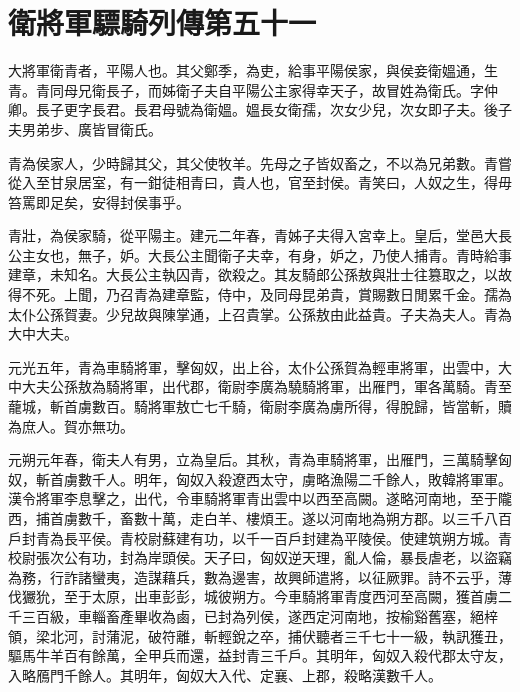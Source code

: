 \chapter{衛將軍驃騎列傳第五十一}

大將軍衛青者，平陽人也。其父鄭季，為吏，給事平陽侯家，與侯妾衛媼通，生青。青同母兄衛長子，而姊衛子夫自平陽公主家得幸天子，故冒姓為衛氏。字仲卿。長子更字長君。長君母號為衛媼。媼長女衛孺，次女少兒，次女即子夫。後子夫男弟步、廣皆冒衛氏。

青為侯家人，少時歸其父，其父使牧羊。先母之子皆奴畜之，不以為兄弟數。青嘗從入至甘泉居室，有一鉗徒相青曰，貴人也，官至封侯。青笑曰，人奴之生，得毋笞罵即足矣，安得封侯事乎。

青壯，為侯家騎，從平陽主。建元二年春，青姊子夫得入宮幸上。皇后，堂邑大長公主女也，無子，妒。大長公主聞衛子夫幸，有身，妒之，乃使人捕青。青時給事建章，未知名。大長公主執囚青，欲殺之。其友騎郎公孫敖與壯士往篡取之，以故得不死。上聞，乃召青為建章監，侍中，及同母昆弟貴，賞賜數日閒累千金。孺為太仆公孫賀妻。少兒故與陳掌通，上召貴掌。公孫敖由此益貴。子夫為夫人。青為大中大夫。

元光五年，青為車騎將軍，擊匈奴，出上谷，太仆公孫賀為輕車將軍，出雲中，大中大夫公孫敖為騎將軍，出代郡，衛尉李廣為驍騎將軍，出雁門，軍各萬騎。青至蘢城，斬首虜數百。騎將軍敖亡七千騎，衛尉李廣為虜所得，得脫歸，皆當斬，贖為庶人。賀亦無功。

元朔元年春，衛夫人有男，立為皇后。其秋，青為車騎將軍，出雁門，三萬騎擊匈奴，斬首虜數千人。明年，匈奴入殺遼西太守，虜略漁陽二千餘人，敗韓將軍軍。漢令將軍李息擊之，出代，令車騎將軍青出雲中以西至高闕。遂略河南地，至于隴西，捕首虜數千，畜數十萬，走白羊、樓煩王。遂以河南地為朔方郡。以三千八百戶封青為長平侯。青校尉蘇建有功，以千一百戶封建為平陵侯。使建筑朔方城。青校尉張次公有功，封為岸頭侯。天子曰，匈奴逆天理，亂人倫，暴長虐老，以盜竊為務，行詐諸蠻夷，造謀藉兵，數為邊害，故興師遣將，以征厥罪。詩不云乎，薄伐玁狁，至于太原，出車彭彭，城彼朔方。今車騎將軍青度西河至高闕，獲首虜二千三百級，車輜畜產畢收為鹵，已封為列侯，遂西定河南地，按榆谿舊塞，絕梓領，梁北河，討蒲泥，破符離，斬輕銳之卒，捕伏聽者三千七十一級，執訊獲丑，驅馬牛羊百有餘萬，全甲兵而還，益封青三千戶。其明年，匈奴入殺代郡太守友，入略鴈門千餘人。其明年，匈奴大入代、定襄、上郡，殺略漢數千人。

